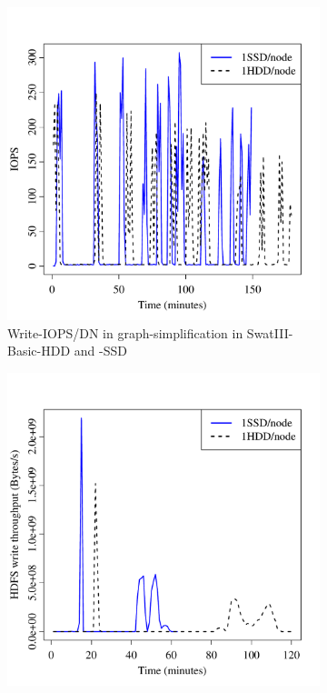 \documentclass[10pt, conference, compsocconf]{IEEEtran}
\begin{document}
\begin{figure}[htb]
\begin{subfigure}[b]{0.23\textwidth}
                \includegraphics[width=\textwidth]{Figure/SystemData/Plots/ECHddSsdWrIops.pdf}
                \caption{Write-IOPS/DN in graph-simplification in SwatIII-Basic-HDD and -SSD}
                \label{fig:ECHddSsdWrIops}
        \end{subfigure}
        \begin{subfigure}[b]{0.23\textwidth}
                \includegraphics[width=\textwidth]{Figure/SystemData/Plots/BGHddSsdHdfsWrIops.pdf}

\end{subfigure}
\end{figure}
\end{document}
